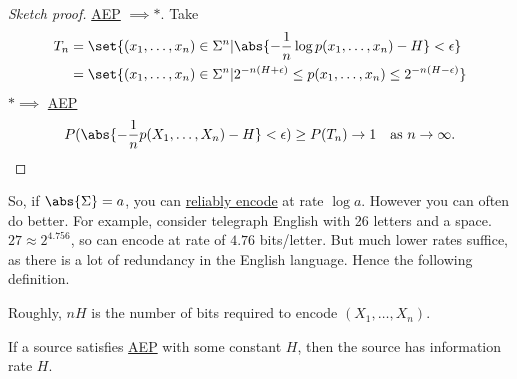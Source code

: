 \documentclass{article}
\begin{document}
\begin{proof}[Sketch proof]
    \hyperlink{def:aep}{AEP} $\implies *$.
    Take
    \begin{align*}
        T_n &= \set{(x_1, \dotsc, x_n) \in \Sigma^n | \abs{-\frac{1}{n} \log p(x_1, \dotsc, x_n) - H} < \epsilon} \\
            &= \set{(x_1, \dotsc, x_n) \in \Sigma^n | 2^{-n(H+\epsilon)} \leq p(x_1, \dotsc, x_n) \leq 2^{-n(H-\epsilon)}} \\
    \end{align*}
    $* \implies$ \hyperlink{def:aep}{AEP}
    \begin{equation*}
        P(\abs{- \frac{1}{n} p(X_1, \dotsc, X_n) - H} < \epsilon) \geq P(T_n) \to 1 \quad \text{as } n \to \infty.
    \end{equation*}
\end{proof}
So, if $\abs{\Sigma}=a$, you can \hyperlink{def:reliablyEncode}{reliably encode} at rate $\log a$. However you can often do better.
For example, consider telegraph English with 26 letters and a space. $27 \approx 2^{4.756}$, so can encode at rate of $4.76$ bits/letter. But much lower rates suffice, as there is a lot of redundancy in the English language.
Hence the following definition.
Roughly, $nH$ is the number of bits required to encode $(X_1, \dotsc, X_n)$.
\begin{nthm}
    If a source satisfies \hyperlink{def:aep}{AEP} with some constant $H$, then the source has information rate $H$.
\end{nthm}
\end{document}
